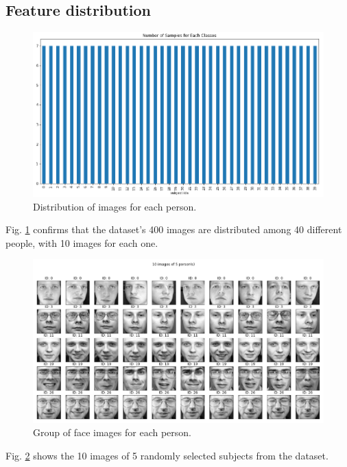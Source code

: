 \documentclass[conference]{IEEEtran}
\begin{document}
\subsection{Feature distribution}

\begin{figure}[]
    \centering
    \includegraphics[scale=0.45]{images/2_samples_per_class.png}
    \caption{Distribution of images for each person.}
    \label{fig:samples_per_class}
\end{figure}

Fig. \ref{fig:samples_per_class} confirms that the dataset's 400 images are distributed among 40 different people, with 10 images for each one. 

\begin{figure}[]
    \centering
    \includegraphics[scale=0.4]{images/1_imgs_of_persons.png}
    \caption{Group of face images for each person.}
    \label{fig:imgs_of_persons}
\end{figure}

Fig. \ref{fig:imgs_of_persons} shows the 10 images of 5 randomly selected subjects from the dataset.
\end{document}
